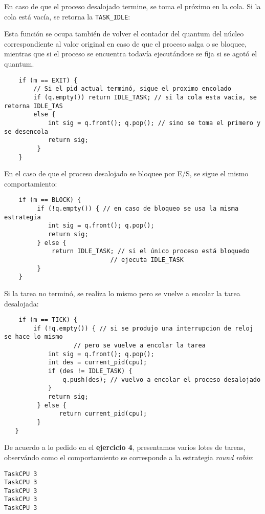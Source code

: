 En caso de que el proceso desalojado termine, se toma el pr\'oximo en la cola. Si la cola est\'a vac\'ia, se retorna la \verb+TASK_IDLE+:

Esta funci\'on se ocupa tambi\'en de volver el contador del quantum del n\'ucleo correspondiente al valor original en caso de que el proceso salga o se bloquee, mientras que si el proceso se encuentra todav\'ia ejecut\'andose se fija si se agot\'o el quantum.

\begin{verbatim}
    if (m == EXIT) {
        // Si el pid actual terminó, sigue el proximo encolado
        if (q.empty()) return IDLE_TASK; // si la cola esta vacia, se retorna IDLE_TAS
        else {
            int sig = q.front(); q.pop(); // sino se toma el primero y se desencola
            return sig;
         }
    } 
\end{verbatim}

En el caso de que el proceso desalojado se bloquee por E/S, se sigue el mismo comportamiento:

\begin{verbatim}
    if (m == BLOCK) {
         if (!q.empty()) { // en caso de bloqueo se usa la misma estrategia
            int sig = q.front(); q.pop();
            return sig;
         } else {
             return IDLE_TASK; // si el único proceso está bloquedo
                             // ejecuta IDLE_TASK
         }
    }
\end{verbatim}

Si la tarea no termin\'o, se realiza lo mismo pero se vuelve a encolar la tarea desalojada:

\begin{verbatim}
    if (m == TICK) {
        if (!q.empty()) { // si se produjo una interrupcion de reloj se hace lo mismo
                   // pero se vuelve a encolar la tarea
            int sig = q.front(); q.pop();
            int des = current_pid(cpu);
            if (des != IDLE_TASK) {
                q.push(des); // vuelvo a encolar el proceso desalojado
            }
            return sig;
         } else {
               return current_pid(cpu);
         }
   }
\end{verbatim}

De acuerdo a lo pedido en el \textbf{ejercicio 4}, presentamos varios lotes de tareas, observ\'ando como el comportamiento se corresponde a la estrategia \textit{round robin}:


\begin{verbatim}
TaskCPU 3
TaskCPU 3
TaskCPU 3
TaskCPU 3
TaskCPU 3
\end{verbatim}

